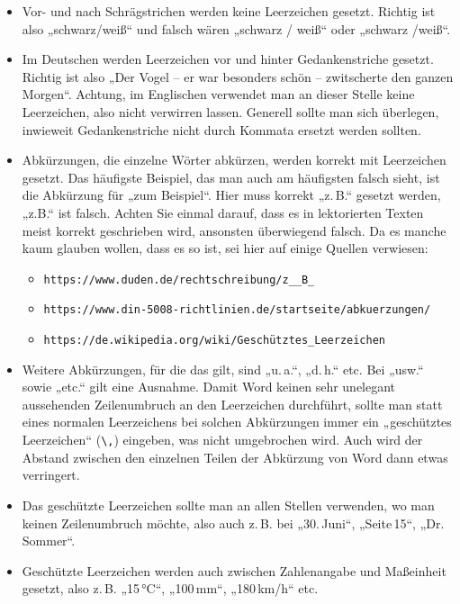 \begin{itemize}
    \item Vor- und nach Schrägstrichen werden keine Leerzeichen gesetzt. Richtig ist also „schwarz/weiß“ und falsch wären „schwarz / weiß“ oder „schwarz /weiß“.

    \item Im Deutschen werden Leerzeichen vor und hinter Gedankenstriche gesetzt. Richtig ist also „Der Vogel – er war besonders schön – zwitscherte den ganzen Morgen“. Achtung, im Englischen verwendet man an dieser Stelle keine Leerzeichen, also nicht verwirren lassen. Generell sollte man sich überlegen, inwieweit Gedankenstriche nicht durch Kommata ersetzt werden sollten.

    \item Abkürzungen, die einzelne Wörter abkürzen, werden korrekt mit Leerzeichen gesetzt. Das häufigste Beispiel, das man auch am häufigsten falsch sieht, ist die Abkürzung für „zum Beispiel“. Hier muss korrekt „z.\,B.“ gesetzt werden, „z.B.“ ist falsch. Achten Sie einmal darauf, dass es in lektorierten Texten meist korrekt geschrieben wird, ansonsten überwiegend falsch. Da es manche kaum glauben wollen, dass es so ist, sei hier auf einige Quellen verwiesen:
    
    \begin{itemize}
        \item \verb|https://www.duden.de/rechtschreibung/z__B_ |
        \item \verb|https://www.din-5008-richtlinien.de/startseite/abkuerzungen/ |
        \item \verb|https://de.wikipedia.org/wiki/Geschütztes_Leerzeichen |
    \end{itemize}

    \item Weitere Abkürzungen, für die das gilt, sind „u.\,a.“, „d.\,h.“ etc. Bei „usw.“ sowie „etc.“ gilt eine Ausnahme. Damit Word keinen sehr unelegant aussehenden Zeilenumbruch an den Leerzeichen durchführt, sollte man statt eines normalen Leerzeichens bei solchen Abkürzungen immer ein „geschütztes Leerzeichen“ (\verb|\,|) eingeben, was nicht umgebrochen wird. Auch wird der Abstand zwischen den einzelnen Teilen der Abkürzung von Word dann etwas verringert.

    \item Das geschützte Leerzeichen sollte man an allen Stellen verwenden, wo man keinen Zeilenumbruch möchte, also auch z.\,B. bei „30.\,Juni“, „Seite\,15“, „Dr.\,Sommer“.

    \item Geschützte Leerzeichen werden auch zwischen Zahlenangabe und Maßeinheit gesetzt, also z.\,B. „15\,°C“, „100\,mm“, „180\,km/h“ etc.
\end{itemize}
